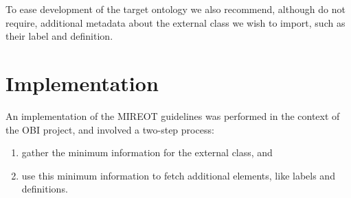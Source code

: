 \documentclass[a4paper,10pt,twocolumn]{article}
\newcommand{\protege}{Prot\'{e}g\'{e}}
\begin{document}


To ease development of the target ontology we also recommend, although do not require, additional metadata about the external class we wish to import, such as their label and definition.





\section*{Implementation}

An implementation of the \ac{MIREOT} guidelines was performed in the context of the \ac{OBI} project, and involved a two-step process:

\begin{enumerate}
\item gather the minimum information for the external class, and
\item use this minimum information to fetch additional elements, like labels and definitions.
\end{enumerate}

\end{document}
